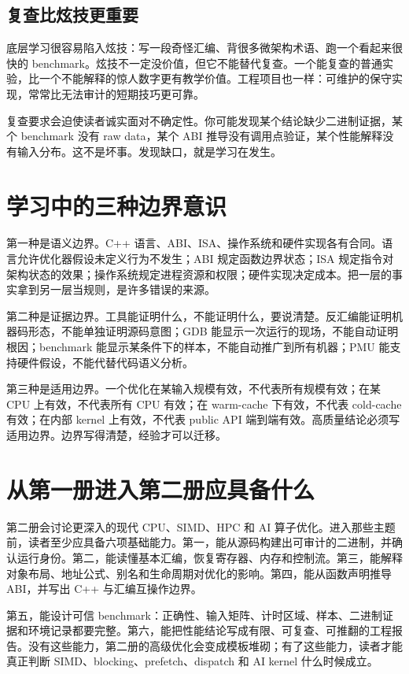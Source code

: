 \subsection{复查比炫技更重要}

底层学习很容易陷入炫技：写一段奇怪汇编、背很多微架构术语、跑一个看起来很快的 benchmark。炫技不一定没价值，但它不能替代复查。一个能复查的普通实验，比一个不能解释的惊人数字更有教学价值。工程项目也一样：可维护的保守实现，常常比无法审计的短期技巧更可靠。

复查要求会迫使读者诚实面对不确定性。你可能发现某个结论缺少二进制证据，某个 benchmark 没有 raw data，某个 ABI 推导没有调用点验证，某个性能解释没有输入分布。这不是坏事。发现缺口，就是学习在发生。

\section{学习中的三种边界意识}

第一种是语义边界。C++ 语言、ABI、ISA、操作系统和硬件实现各有合同。语言允许优化器假设未定义行为不发生；ABI 规定函数边界状态；ISA 规定指令对架构状态的效果；操作系统规定进程资源和权限；硬件实现决定成本。把一层的事实拿到另一层当规则，是许多错误的来源。

第二种是证据边界。工具能证明什么，不能证明什么，要说清楚。反汇编能证明机器码形态，不能单独证明源码意图；GDB 能显示一次运行的现场，不能自动证明根因；benchmark 能显示某条件下的样本，不能自动推广到所有机器；PMU 能支持硬件假设，不能代替代码语义分析。

第三种是适用边界。一个优化在某输入规模有效，不代表所有规模有效；在某 CPU 上有效，不代表所有 CPU 有效；在 warm-cache 下有效，不代表 cold-cache 有效；在内部 kernel 上有效，不代表 public API 端到端有效。高质量结论必须写适用边界。边界写得清楚，经验才可以迁移。

\section{从第一册进入第二册应具备什么}

第二册会讨论更深入的现代 CPU、SIMD、HPC 和 AI 算子优化。进入那些主题前，读者至少应具备六项基础能力。第一，能从源码构建出可审计的二进制，并确认运行身份。第二，能读懂基本汇编，恢复寄存器、内存和控制流。第三，能解释对象布局、地址公式、别名和生命周期对优化的影响。第四，能从函数声明推导 ABI，并写出 C++ 与汇编互操作边界。

第五，能设计可信 benchmark：正确性、输入矩阵、计时区域、样本、二进制证据和环境记录都要完整。第六，能把性能结论写成有限、可复查、可推翻的工程报告。没有这些能力，第二册的高级优化会变成模板堆砌；有了这些能力，读者才能真正判断 SIMD、blocking、prefetch、dispatch 和 AI kernel 什么时候成立。

